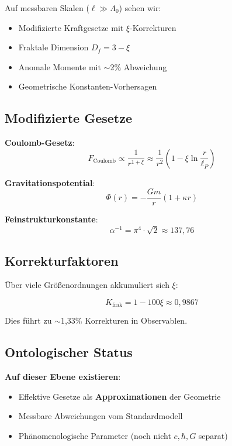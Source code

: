 \begin{keyresult}
Auf messbaren Skalen ($\ell \gg \Lambda_0$) sehen wir:

\begin{itemize}
\item Modifizierte Kraftgesetze mit $\xi$-Korrekturen
\item Fraktale Dimension $D_f = 3-\xi$
\item Anomale Momente mit $\sim$2\% Abweichung
\item Geometrische Konstanten-Vorhersagen
\end{itemize}
\end{keyresult}

\subsection{Modifizierte Gesetze}

\textbf{Coulomb-Gesetz}:
\begin{equation}
F_{\text{Coulomb}} \propto \frac{1}{r^{1+\xi}} \approx \frac{1}{r^2} \left(1 - \xi \ln\frac{r}{\ell_P}\right)
\end{equation}

\textbf{Gravitationspotential}:
\begin{equation}
\Phi(r) = -\frac{Gm}{r}(1 + \kappa r)
\end{equation}

\textbf{Feinstrukturkonstante}:
\begin{equation}
\alpha^{-1} = \pi^4 \cdot \sqrt{2} \approx 137{,}76
\end{equation}

\subsection{Korrekturfaktoren}

Über viele Größenordnungen akkumuliert sich $\xi$:

\begin{equation}
K_{\text{frak}} = 1 - 100\xi \approx 0{,}9867
\end{equation}

Dies führt zu $\sim$1{,}33\% Korrekturen in Observablen.

\subsection{Ontologischer Status}

\textbf{Auf dieser Ebene existieren}:
\begin{itemize}
\item Effektive Gesetze als \textbf{Approximationen} der Geometrie
\item Messbare Abweichungen vom Standardmodell
\item Phänomenologische Parameter (noch nicht $c, \hbar, G$ separat)
\end{itemize}

